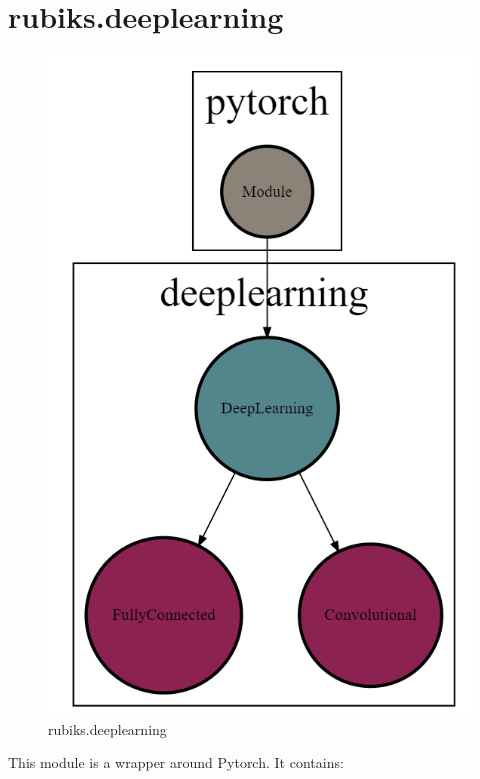 \section{rubiks.deeplearning}
\begin{figure}[H]
\centering
\includegraphics[scale=0.25]{./Figures/codebasedeeplearning}
\caption[Codebase]{rubiks.deeplearning}
\label{fig:Codebasedeeplearning}
\end{figure}
This module is a wrapper around Pytorch. It contains:
